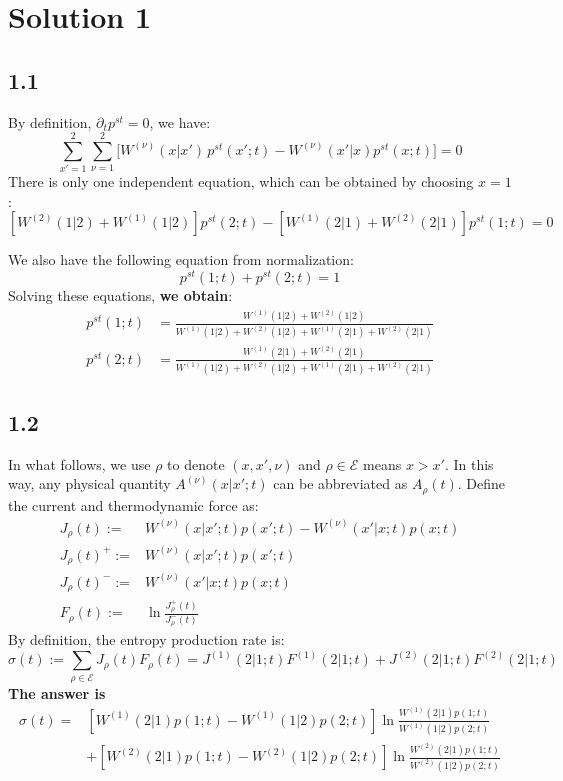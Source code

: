 \documentclass[11pt]{article}
\begin{document}
	\section*{Solution 1}
	\subsection*{1.1}
	By definition, $\partial_t p^{st}=0$, we have:
	\[
	\sum_{x'=1}^{2}\sum_{\nu=1}^{2}
	\Big[
	W^{(\nu)}(x|x')\,p^{st}(x';t)
	-
	W^{(\nu)}(x'|x)p^{st}(x;t)\Big]=0
	\]
	There is only one independent equation, which can be obtained by choosing $x=1$:
	\[
	\left[W^{(2)}(1|2)+W^{(1)}(1|2)\right]p^{st}(2;t)-\left[W^{(1)}(2|1)+W^{(2)}(2|1)\right]p^{st}(1;t)=0
	\]
	
	We also have the following equation from normalization:
	\[
	p^{st}(1;t)+p^{st}(2;t)=1
	\]
	Solving these equations, \textbf{we obtain}:
	\[
	\boxed{
		\begin{aligned}
			p^{st}(1;t)&=\frac{W^{(1)}(1|2)+W^{(2)}(1|2)}{W^{(1)}(1|2)+W^{(2)}(1|2)+W^{(1)}(2|1)+W^{(2)}(2|1)}\\
			p^{st}(2;t)&=\frac{W^{(1)}(2|1)+W^{(2)}(2|1)}{W^{(1)}(1|2)+W^{(2)}(1|2)+W^{(1)}(2|1)+W^{(2)}(2|1)}
		\end{aligned}
	}
	\]
	\subsection*{1.2}
	
In what follows, we use $\rho$ to denote $(x,x',\nu)$ and $\rho\in\mathcal{E}$ means $x>x'$.  In this way, any physical quantity $A^{(\nu)}(x|x';t)$ can be abbreviated as $A_\rho(t)$. Define the current and thermodynamic force as:
	\[
	\begin{aligned}
		J_\rho(t):=& W^{(\nu)}(x|x';t)p(x';t)-W^{(\nu)}(x'|x;t)p(x;t)\\
		J_\rho(t)^+:=& W^{(\nu)}(x|x';t)p(x';t)\\
		J_\rho(t)^-:=& W^{(\nu)}(x'|x;t)p(x;t)\\
		F_\rho(t):=&\ln\frac{J^+_\rho(t)}{J_\rho^-(t)}
	\end{aligned}
	\]
	By definition, the entropy production rate is:
	\[
	\sigma(t):=\sum_{\rho \in\mathcal{E}}J_\rho(t) F_\rho(t) = J^{(1)}(2|1;t)F^{(1)}(2|1;t)+J^{(2)}(2|1;t)F^{(2)}(2|1;t)
	\]
	\textbf{The answer is}
	\[
	\boxed{
		\begin{aligned}
			\sigma(t)=&\left[W^{(1)}(2|1)p(1;t)-W^{(1)}(1|2)p(2;t)\right]\ln\frac{W^{(1)}(2|1)p(1;t)}{W^{(1)}(1|2)p(2;t)}
			\\&+\left[W^{(2)}(2|1)p(1;t)-W^{(2)}(1|2)p(2;t)\right]\ln\frac{W^{(2)}(2|1)p(1;t)}{W^{(2)}(1|2)p(2;t)}
		\end{aligned}
	}
	\]
\end{document}
